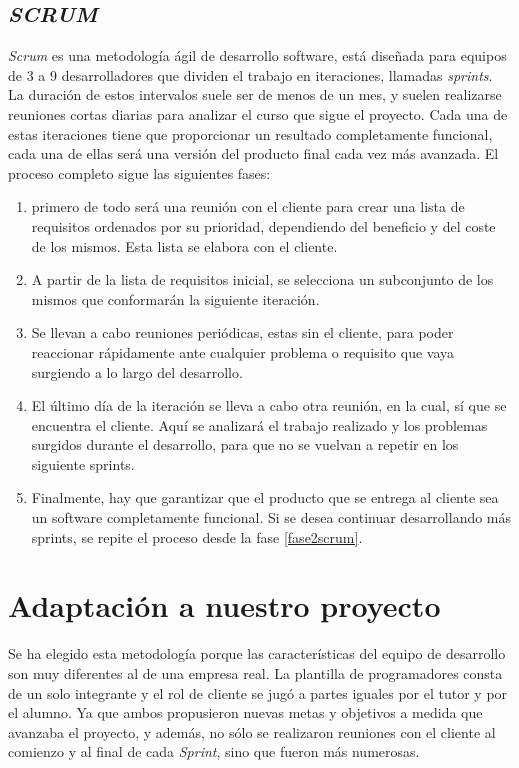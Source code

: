 \subsection*{\textit{SCRUM}}
\textit{Scrum} es una metodología ágil de desarrollo software, está diseñada para equipos de 3 a 9 desarrolladores que dividen el trabajo en iteraciones, llamadas \textit{sprints}. La duración de estos intervalos suele ser de menos de un mes, y suelen realizarse reuniones cortas diarias para analizar el curso que sigue el proyecto.
Cada una de estas iteraciones tiene que proporcionar un resultado completamente funcional, cada una de ellas será una versión del producto final cada vez más avanzada. El proceso completo sigue las siguientes fases:
\begin{enumerate}
\item \label{fase1scrum} primero de todo será una reunión con el cliente para crear una lista de requisitos ordenados por su prioridad, dependiendo del beneficio y del coste de los mismos. Esta lista se elabora con el cliente.
\item \label{fase2scrum} A partir de la lista de requisitos inicial, se selecciona un subconjunto de los mismos que conformarán la siguiente iteración.
\item Se llevan a cabo reuniones periódicas, estas sin el cliente, para poder reaccionar rápidamente ante cualquier problema o requisito que vaya surgiendo a lo largo del desarrollo.
\item El último día de la iteración se lleva a cabo otra reunión, en la cual, sí que se encuentra el cliente. Aquí se analizará el trabajo realizado y los problemas surgidos durante el desarrollo, para que no se vuelvan a repetir en los siguiente sprints.
\item Finalmente, hay que garantizar que el producto que se entrega al cliente sea un software completamente funcional. Si se desea continuar desarrollando más sprints, se repite el proceso desde la fase \ref{fase2scrum}.
\end{enumerate}
\section{Adaptación a nuestro proyecto}
Se ha elegido esta metodología porque las características del equipo de desarrollo son muy diferentes al de una empresa real. La plantilla de programadores consta de un solo integrante y el rol de cliente se jugó a partes iguales por el tutor y por el alumno. Ya que ambos propusieron nuevas metas y objetivos a medida que avanzaba el proyecto, y además, no sólo se realizaron reuniones con el cliente al comienzo y al final de cada \textit{Sprint}, sino que fueron más numerosas.
